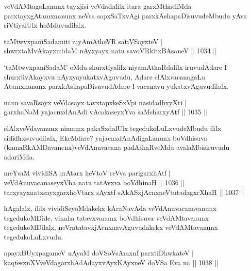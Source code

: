 \begin{artha}
veVdAMtagaLanunx tayxjisi veVdadalilx itara garxMthadiMda parxtayxgAtamxnanunx neVra
sapxSaTxvAgi parxkAshapaDisuvudeMbudu yAva riVtiyalUlx hoMduvudilalx.
\end{artha}

\begin{shl}
taMtwvxpaniSadamiti niyAmAtheVR satiVSayxteV |\\
shwrxtaMvAkayxmidaM nAyxyayx natu savoVRkitxBAsaneV || 1034 ||
\end{shl}

\begin{artha}
`taMtwvxpaniSadaM' eMdu shurxtiyalilx niyamAthaRdalilx iruvudAdare I shurxtivAkayxvu 
nAyxyayukatxvAguvudu, Adare elAlxvacanagaLu Atamxnanunx parxkAshapaDisuvudAdare I vacanavu 
yukatxvAguvudilalx.
\end{artha}


\begin{shl}
nanu savaRsayx veVdasayx tavxtapxkeSxV\s pi nasidadhxyXti |\\
garxhaNaM yajacnxdAnAdi vAcakaseyxYva saMsharxyAtf || 1035 ||
\end{shl}

\begin{artha}
elAlxveVdavanunx nimamx pakaSxdalUlx tegedukoLuLxvudeMbudu ililx sididhxsuvudilalx, EkeMdare? yajacnxdAnAdigaLanunx boVdhisuva (kamaRkAMDavanenx)veVdAnuvacana padAthaRveMdu avalaMbisiruvudu adariMda.
\end{artha}


\begin{shl}
meYvaM vividiSA mAtarx heVtoV reVva parigarxhAtf |\\
veVdAnuvacanaseyxVha natu tatAvxva boVdhinaH || 1036 ||\\
tarxyayxnatxsayxgarxhoVtarx sAyxtf sAkASxjAcnxneVtutadagxrXhaH || 1037 ||
\end{shl}

\begin{artha}
hAgalalx, ililx vividiSeyoMdakekx kAraNavAda veVdAnuvacanavanunx tegedukoMDide, vinaha 
tatavxvanunx boVdhisuva veVdAMtavanunx tegedukoMDilalx, neVratatavxjAcnxnavAguvudakekx 
veVdAMtavanunx tegedukoLuLxvudu.
\end{artha}

\begin{shl}
apayxBUyxpagameV nAyaM doVSoV\s sAmxnf parxtiDhwkateV |\\
kaqtesxnXVveVdagarxhAdAdayxvAyxKAyxneV doVSa Eva na || 1038 ||
\end{shl}


